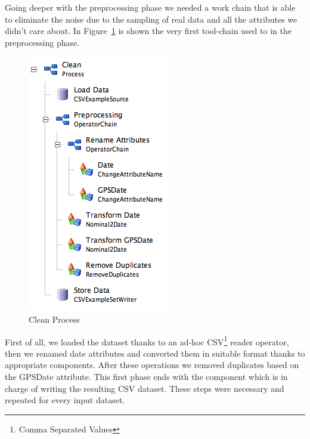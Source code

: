 Going deeper with the preprocessing phase we needed a work chain that is able to eliminate the noise due to the sampling of real data and all the attributes we didn't care about.
In Figure~\ref{figure:clean} is shown the very first tool-chain used to in the preprocessing phase.\newline


\begin{figure}
  \begin{center}
    \includegraphics[scale=0.6]{images/clean.png}
  \end{center}
  \caption{Clean Process}
  \label{figure:clean}
\end{figure}





First of all, we loaded the dataset thanks to an ad-hoc CSV\footnote{Comma Separated Values} reader operator, then we renamed date attributes and converted them in suitable format thanks to appropriate components. After these operations we removed duplicates based on the GPSDate attribute. This first phase ends with the component which is in charge of writing the resulting CSV dataset. These steps were necessary and repeated for every input dataset.\newline

